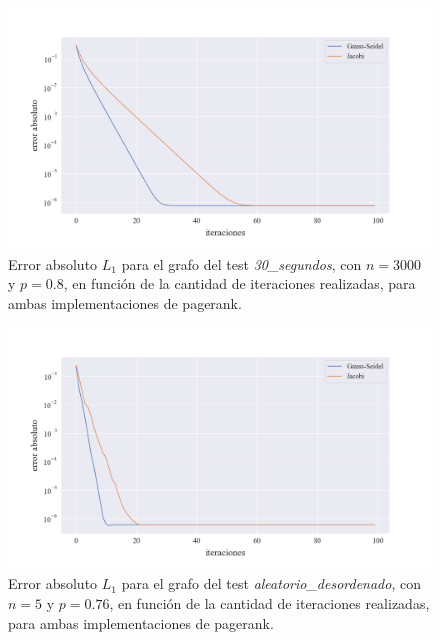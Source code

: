 \newpage
\begin{figure}[!htbp]
    \centering
    \includegraphics[width=1\textwidth, trim=0 0 0 10]{files/src/.media/convergencia_test_30_segundos.png}
    \caption{Error absoluto $L_1$ para el grafo del test \textit{30\_segundos}, con $n = 3000$ y $p = 0.8$, en función de la cantidad de iteraciones realizadas, para ambas implementaciones de pagerank.} \label{test_30_segundos}
\end{figure}

\begin{figure}[!htbp]
    \centering
    \includegraphics[width=1\textwidth, trim=0 0 0 30]{files/src/.media/convergencia_test_aleatorio_desordenado.png}
    \caption{Error absoluto $L_1$ para el grafo del test \textit{aleatorio\_desordenado}, con $n = 5$ y $p = 0.76$, en función de la cantidad de iteraciones realizadas, para ambas implementaciones de pagerank.} \label{test_aleatorio_desordenado}
\end{figure}

